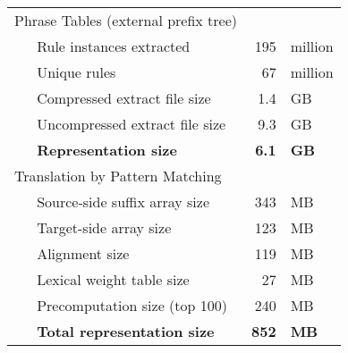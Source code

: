 \begin{tabular}{llr@{~}l}
	\multicolumn{2}{l}{Phrase Tables (external prefix tree)} & & \\
	~ & Rule instances extracted & 195 & million \\
	~ & Unique rules & 67 & million\\
	~ & Compressed extract file size & 1.4 & GB \\
	~ & Uncompressed extract file size & 9.3 & GB \\
	~ & {\bf Representation size} & {\bf 6.1} & {\bf GB} \\
	\multicolumn{2}{l}{Translation by Pattern Matching} & & \\
	~ & Source-side suffix array size & 343 & MB \\
	~ & Target-side array size & 123 & MB\\
	~ & Alignment size & 119 & MB \\
	~ & Lexical weight table size & 27 & MB \\
	~ & Precomputation size (top 100) & 240 & MB \\
	~ & {\bf Total representation size} & {\bf 852} & {\bf MB} \\
\end{tabular}

